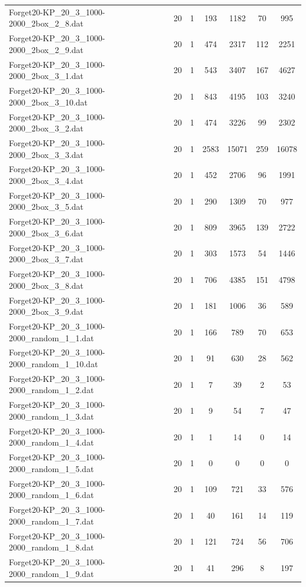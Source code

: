 \begin{table}[!ht]
\begin{tabular}{lcccccc}
Forget20-KP\_20\_3\_1000-2000\_2box\_2\_8.dat & 20 & 1 & 193 & 1182 & 70 & 995 \\
Forget20-KP\_20\_3\_1000-2000\_2box\_2\_9.dat & 20 & 1 & 474 & 2317 & 112 & 2251 \\
Forget20-KP\_20\_3\_1000-2000\_2box\_3\_1.dat & 20 & 1 & 543 & 3407 & 167 & 4627 \\
Forget20-KP\_20\_3\_1000-2000\_2box\_3\_10.dat & 20 & 1 & 843 & 4195 & 103 & 3240 \\
Forget20-KP\_20\_3\_1000-2000\_2box\_3\_2.dat & 20 & 1 & 474 & 3226 & 99 & 2302 \\
Forget20-KP\_20\_3\_1000-2000\_2box\_3\_3.dat & 20 & 1 & 2583 & 15071 & 259 & 16078 \\
Forget20-KP\_20\_3\_1000-2000\_2box\_3\_4.dat & 20 & 1 & 452 & 2706 & 96 & 1991 \\
Forget20-KP\_20\_3\_1000-2000\_2box\_3\_5.dat & 20 & 1 & 290 & 1309 & 70 & 977 \\
Forget20-KP\_20\_3\_1000-2000\_2box\_3\_6.dat & 20 & 1 & 809 & 3965 & 139 & 2722 \\
Forget20-KP\_20\_3\_1000-2000\_2box\_3\_7.dat & 20 & 1 & 303 & 1573 & 54 & 1446 \\
Forget20-KP\_20\_3\_1000-2000\_2box\_3\_8.dat & 20 & 1 & 706 & 4385 & 151 & 4798 \\
Forget20-KP\_20\_3\_1000-2000\_2box\_3\_9.dat & 20 & 1 & 181 & 1006 & 36 & 589 \\
Forget20-KP\_20\_3\_1000-2000\_random\_1\_1.dat & 20 & 1 & 166 & 789 & 70 & 653 \\
Forget20-KP\_20\_3\_1000-2000\_random\_1\_10.dat & 20 & 1 & 91 & 630 & 28 & 562 \\
Forget20-KP\_20\_3\_1000-2000\_random\_1\_2.dat & 20 & 1 & 7 & 39 & 2 & 53 \\
Forget20-KP\_20\_3\_1000-2000\_random\_1\_3.dat & 20 & 1 & 9 & 54 & 7 & 47 \\
Forget20-KP\_20\_3\_1000-2000\_random\_1\_4.dat & 20 & 1 & 1 & 14 & 0 & 14 \\
Forget20-KP\_20\_3\_1000-2000\_random\_1\_5.dat & 20 & 1 & 0 & 0 & 0 & 0 \\
Forget20-KP\_20\_3\_1000-2000\_random\_1\_6.dat & 20 & 1 & 109 & 721 & 33 & 576 \\
Forget20-KP\_20\_3\_1000-2000\_random\_1\_7.dat & 20 & 1 & 40 & 161 & 14 & 119 \\
Forget20-KP\_20\_3\_1000-2000\_random\_1\_8.dat & 20 & 1 & 121 & 724 & 56 & 706 \\
Forget20-KP\_20\_3\_1000-2000\_random\_1\_9.dat & 20 & 1 & 41 & 296 & 8 & 197 \\

\end{tabular}
\end{table}
